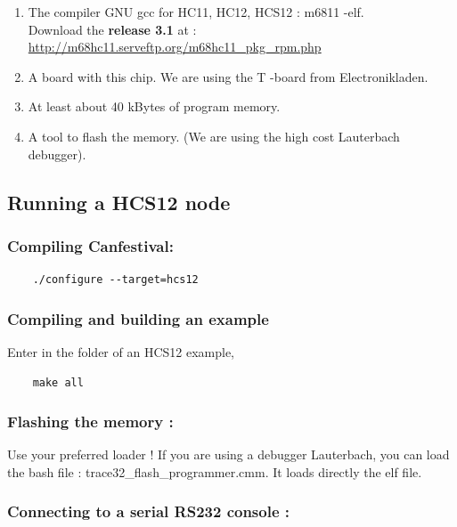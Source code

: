 \documentclass[12pt,english,a4paper]{book}
\begin{document}
\begin{enumerate}
\item The compiler GNU gcc for HC11, HC12, HCS12 : m6811 -elf. \\
 Download the \textbf{release 3.1} at : \href{http://m68hc11.serveftp.org/m68hc11_pkg_rpm.php}{http://m68hc11.serveftp.org/m68hc11\_pkg\_rpm.php} 
\item A board with this chip. We are using the T -board from Electronikladen. 
\item At least about 40 kBytes of program memory. 
\item A tool to flash the memory. (We are using the high cost Lauterbach
debugger). 
\end{enumerate}

\subsection{Running a HCS12 node}


\subsubsection{Compiling Canfestival:}

\begin{verbatim}
	./configure --target=hcs12
\end{verbatim}


\subsubsection{Compiling and building an example}

Enter in the folder of an HCS12 example,

\begin{verbatim}
	make all
\end{verbatim}


\subsubsection{Flashing the memory :}

Use your preferred loader ! If you are using a debugger Lauterbach,
you can load the bash file : trace32\_flash\_programmer.cmm. It loads
directly the elf file.


\subsubsection{Connecting to a serial RS232 console :}
\end{document}
